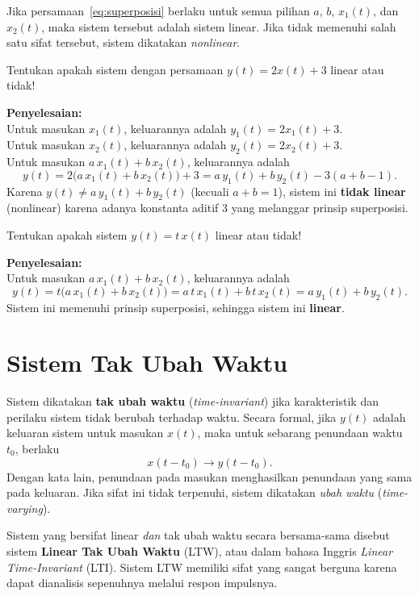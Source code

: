 Jika persamaan~\ref{eq:superposisi} berlaku untuk semua pilihan $a$, $b$, $x_1(t)$, dan $x_2(t)$, maka sistem tersebut adalah sistem linear. Jika tidak memenuhi salah satu sifat tersebut, sistem dikatakan \textit{nonlinear}.

\begin{exmp}
Tentukan apakah sistem dengan persamaan $y(t) = 2x(t) + 3$ linear atau tidak!

\textbf{Penyelesaian:}\\
Untuk masukan $x_1(t)$, keluarannya adalah $y_1(t) = 2x_1(t) + 3$.\\
Untuk masukan $x_2(t)$, keluarannya adalah $y_2(t) = 2x_2(t) + 3$.\\
Untuk masukan $a\,x_1(t) + b\,x_2(t)$, keluarannya adalah
\[
y(t) = 2\bigl(a\,x_1(t) + b\,x_2(t)\bigr) + 3 = a\,y_1(t) + b\,y_2(t) - 3(a+b-1).
\]
Karena $y(t) \ne a\,y_1(t) + b\,y_2(t)$ (kecuali $a+b=1$), sistem ini \textbf{tidak linear} (nonlinear) karena adanya konstanta aditif $3$ yang melanggar prinsip superposisi.
\end{exmp}

\begin{exmp}
Tentukan apakah sistem $y(t) = t\,x(t)$ linear atau tidak!

\textbf{Penyelesaian:}\\
Untuk masukan $a\,x_1(t) + b\,x_2(t)$, keluarannya adalah
\[
y(t) = t\bigl(a\,x_1(t)+b\,x_2(t)\bigr) = a\,t\,x_1(t) + b\,t\,x_2(t) = a\,y_1(t)+b\,y_2(t).
\]
Sistem ini memenuhi prinsip superposisi, sehingga sistem ini \textbf{linear}.
\end{exmp}

\section{Sistem Tak Ubah Waktu}

Sistem dikatakan \textbf{tak ubah waktu} (\textit{time-invariant}) jika karakteristik dan perilaku sistem tidak berubah terhadap waktu. Secara formal, jika $y(t)$ adalah keluaran sistem untuk masukan $x(t)$, maka untuk sebarang penundaan waktu $t_0$, berlaku
\begin{equation}
x(t - t_0) \longrightarrow y(t - t_0).
\label{eq:tak-ubah-waktu}
\end{equation}
Dengan kata lain, penundaan pada masukan menghasilkan penundaan yang sama pada keluaran. Jika sifat ini tidak terpenuhi, sistem dikatakan \textit{ubah waktu} (\textit{time-varying}).

Sistem yang bersifat linear \textit{dan} tak ubah waktu secara bersama-sama disebut sistem \textbf{Linear Tak Ubah Waktu} (LTW), atau dalam bahasa Inggris \textit{Linear Time-Invariant} (LTI). Sistem LTW memiliki sifat yang sangat berguna karena dapat dianalisis sepenuhnya melalui respon impulsnya.

